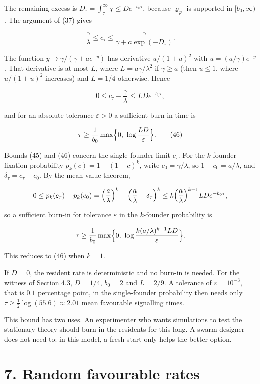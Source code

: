 \documentclass[
  british,
  11pt,
  a4paper,
]{article}
\begin{document}
The remaining excess is
\(D_\tau=\int_\tau^\infty\chi\le De^{-b_0\tau}\), because
\(\varrho_\varphi\) is supported in \([b_0,\infty)\). The argument of
(37) gives

\[
\frac\gamma\lambda\le c_\tau\le\frac\gamma{\gamma+a\exp(-D_\tau)}.
\tag{44}
\]

The function \(y\mapsto\gamma/(\gamma+ae^{-y})\) has derivative
\(u/(1+u)^2\) with \(u=(a/\gamma)e^{-y}\). That derivative is at most
\(L\), where \(L=a\gamma/\lambda^2\) if \(\gamma\ge a\) (then \(u\le1\),
where \(u/(1+u)^2\) increases) and \(L=1/4\) otherwise. Hence

\[
0\le c_\tau-\frac\gamma\lambda\le LDe^{-b_0\tau},
\tag{45}
\]

and for an absolute tolerance \(\varepsilon>0\) a sufficient burn-in
time is

\[
\tau\ge\frac1{b_0}\max\Bigl\{0,\ \log\frac{LD}{\varepsilon}\Bigr\}.
\tag{46}
\]

Bounds (45) and (46) concern the single-founder limit \(c_\tau\). For
the \(k\)-founder fixation probability \(p_k(c)=1-(1-c)^k\), write
\(c_0=\gamma/\lambda\), so \(1-c_0=a/\lambda\), and
\(\delta_\tau=c_\tau-c_0\). By the mean value theorem,

\[
0\le p_k(c_\tau)-p_k(c_0)=\Bigl(\frac a\lambda\Bigr)^k-\Bigl(\frac a\lambda-\delta_\tau\Bigr)^k\le k\Bigl(\frac a\lambda\Bigr)^{k-1}LDe^{-b_0\tau},
\]

so a sufficient burn-in for tolerance \(\varepsilon\) in the
\(k\)-founder probability is

\[
\tau\ge\frac1{b_0}\max\Bigl\{0,\ \log\frac{k(a/\lambda)^{k-1}LD}{\varepsilon}\Bigr\}.
\]

This reduces to (46) when \(k=1\).

If \(D=0\), the resident rate is deterministic and no burn-in is needed.
For the witness of Section 4.3, \(D=1/4\), \(b_0=2\) and \(L=2/9\). A
tolerance of \(\varepsilon=10^{-3}\), that is \(0.1\) percentage point,
in the single-founder probability then needs only
\(\tau\ge\frac12\log(55.6)\approx2.01\) mean favourable signalling
times.

This bound has two uses. An experimenter who wants simulations to test
the stationary theory should burn in the residents for this long. A
swarm designer does not need to: in this model, a fresh start only helps
the better option.

\section{7. Random favourable rates}\label{random-favourable-rates}
\end{document}
